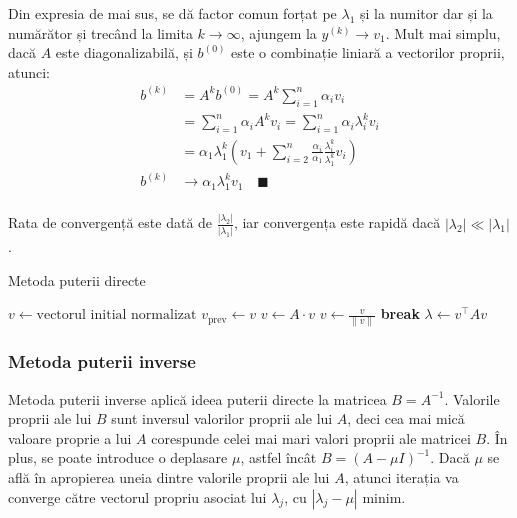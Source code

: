 \documentclass{exam}
\begin{document}
Din expresia de mai sus, se dă factor comun forțat pe $\lambda_1$ și la numitor
dar și la numărător și trecând la limita $k \to \infty$, ajungem la $y^{(k)} \to v_1$.
Mult mai simplu, dacă $A$ este diagonalizabilă, și $b^{(0)}$ este o combinație
liniară a vectorilor proprii, atunci:
\begin{align*}
	b^{(k)} & = A^k b^{(0)} = A^k \sum_{i=1}^n \alpha_i v_i                                                               \\
	        & = \sum_{i=1}^n \alpha_i A^k v_i = \sum_{i=1}^n \alpha_i \lambda_i^k v_i                                     \\
	        & = \alpha_1 \lambda_1^k ( v_1 +  \sum_{i=2}^n \frac{\alpha_i}{\alpha_1} \frac{\lambda_i^k}{\lambda_1^k} v_i) \\
	b^{(k)} & \to \alpha_1 \lambda_1^k v_1 \quad \blacksquare                                                             \\
\end{align*}

Rata de convergență este dată de $\frac{|\lambda_2|}{|\lambda_1|}$, iar
convergența este rapidă dacă $|\lambda_2| \ll |\lambda_1|$.

\begin{algorithm}
	\caption{Metoda puterii directe}
	\begin{algorithmic}[1]
		\State \( v \gets \text{vectorul initial normalizat} \)
		\State \( v_{\text{prev}} \gets v \)
		\State \( v \gets A \cdot v \)
		\State \( v \gets \frac{v}{\| v \|} \)
		\State \textbf{break}
		\EndIf
		\EndFor
		\State \( \lambda \gets v^\top A v \)
	\end{algorithmic}
\end{algorithm}

\subsubsection{Metoda puterii inverse}

Metoda puterii inverse aplică ideea puterii directe la matricea
$B = A^{-1}$. Valorile proprii ale lui $B$ sunt inversul valorilor proprii ale lui
$A$, deci cea mai mică valoare proprie a lui $A$ corespunde celei mai mari
valori proprii ale matricei $B$. În plus, se poate introduce o deplasare $\mu$,
astfel încât $B = (A - \mu I)^{-1}$. Dacă $\mu$ se află în apropierea uneia
dintre valorile proprii ale lui $A$, atunci iterația va converge către vectorul
propriu asociat lui $\lambda_j$, cu $|\lambda_j - \mu|$ minim.
\end{document}
